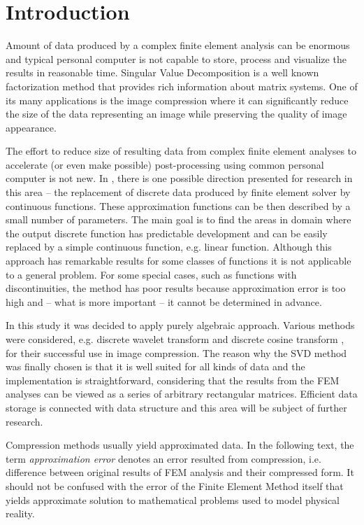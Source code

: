 \section{Introduction}
\label{sec:introduction}


Amount of data produced by a complex finite element analysis can be enormous and typical personal computer is not capable to store, process and visualize the results in reasonable time. Singular Value Decomposition is a well known factorization method that provides rich information about matrix systems. One of its many applications is the image compression where it can significantly reduce the size of the data representing an image while preserving the quality of image appearance.

The effort to reduce size of resulting data from complex finite element analyses to accelerate (or even make possible) post-processing using common personal computer is not new. In \cite{Benes2016}, there is one possible direction presented for research in this area -- the replacement of discrete data produced by finite element solver by continuous functions. These approximation functions can be then described by a small number of parameters. The main goal is to find the areas in domain where the output discrete function has predictable development and can be easily replaced by a simple continuous function, e.g. linear function. Although this approach has remarkable results for some classes of functions it is not applicable to a general problem. For some special cases, such as functions with discontinuities, the method has poor results because approximation error is too high and -- what is more important -- it cannot be determined in advance.

In this study it was decided to apply purely algebraic approach. Various methods were considered, e.g. discrete wavelet transform \cite{Lui2001} and discrete cosine transform \cite{Watson1994}, for their successful use in image compression. The reason why the SVD method was finally chosen is that it is well suited for all kinds of data and the implementation is straightforward, considering that the results from the FEM analyses can be viewed as a series of arbitrary rectangular matrices. Efficient data storage is connected with data structure \cite{Ivanyi2012, Ivanyi2014} and this area will be subject of further research.

Compression methods usually yield approximated data. In the following text, the term \textit{approximation error} denotes an error resulted from compression, i.e. difference between original results of FEM analysis and their compressed form. It should not be confused with the error of the Finite Element Method itself that yields approximate solution to mathematical problems used to model physical reality.

